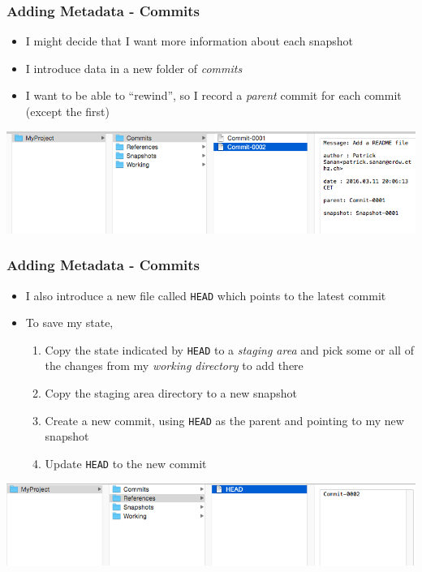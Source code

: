 \documentclass{beamer}
\begin{document}
\begin{frame}[fragile]
\frametitle{Adding Metadata - Commits}
\begin{itemize}
\item I might decide that I want more information about each snapshot
\item I introduce data in a new folder of \emph{commits} 
\item I want to be able to ``rewind'', so I record a \emph{parent} commit for each commit (except the first)
\end{itemize}
\includegraphics[scale=0.4]{commit1.png}\\
\end{frame}

\begin{frame}[fragile]
\frametitle{Adding Metadata - Commits}
\begin{itemize}
\item I also introduce a new file called \texttt{HEAD} which points to the latest commit
\item To save my state,
\begin{enumerate}
\item Copy the state indicated by \texttt{HEAD} to a \emph{staging area} and pick some or all of the changes from my \emph{working directory} to add there
\item Copy the staging area directory to a new snapshot
\item Create a new commit, using \texttt{HEAD} as the parent and pointing to my new snapshot
\item Update \texttt{HEAD} to the new commit
\end{enumerate}
\end{itemize}
\includegraphics[scale=0.4]{commit2.png}
\end{frame}
\end{document}
